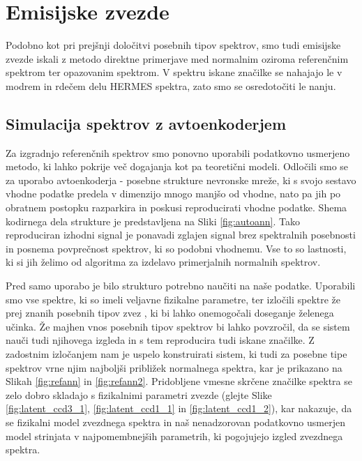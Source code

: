 \section{Emisijske zvezde}
\label{sec:slo_emisijske}
Podobno kot pri prejšnji določitvi posebnih tipov spektrov, smo tudi emisijske zvezde iskali z metodo direktne primerjave med normalnim oziroma referenčnim spektrom ter opazovanim spektrom. V spektru iskane značilke se nahajajo le v modrem in rdečem delu HERMES spektra, zato smo se osredotočiti le nanju.

\subsection{Simulacija spektrov z avtoenkoderjem}
Za izgradnjo referenčnih spektrov smo ponovno uporabili podatkovno usmerjeno metodo, ki lahko pokrije več dogajanja kot pa teoretični modeli. Odločili smo se za uporabo avtoenkoderja - posebne strukture nevronske mreže, ki s svojo sestavo vhodne podatke predela v dimenzijo mnogo manjšo od vhodne, nato pa jih po obratnem postopku razparkira in poskusi reproducirati vhodne podatke. Shema kodirnega dela strukture je predstavljena na Sliki \ref{fig:autoann}. Tako reproduciran izhodni signal je ponavadi zglajen signal brez spektralnih posebnosti in posnema povprečnost spektrov, ki so podobni vhodnemu. Vse to so lastnosti, ki si jih želimo od algoritma za izdelavo primerjalnih normalnih spektrov. 

Pred samo uporabo je bilo strukturo potrebno naučiti na naše podatke. Uporabili smo vse spektre, ki so imeli veljavne fizikalne parametre, ter izločili spektre že prej znanih posebnih tipov zvez \cite{2017ApJS..228...24T}, ki bi lahko onemogočali doseganje želenega učinka. Že majhen vnos posebnih tipov spektrov bi lahko povzročil, da se sistem nauči tudi njihovega izgleda in s tem reproducira tudi iskane značilke. Z zadostnim izločanjem nam je uspelo konstruirati sistem, ki tudi za posebne tipe spektrov vrne njim najboljši približek normalnega spektra, kar je prikazano na Slikah \ref{fig:refann} in \ref{fig:refann2}. Pridobljene vmesne skrčene značilke spektra se zelo dobro skladajo s fizikalnimi parametri zvezde (glejte Slike \ref{fig:latent_ccd3_1}, \ref{fig:latent_ccd1_1} in \ref{fig:latent_ccd1_2}), kar nakazuje, da se fizikalni model zvezdnega spektra in naš nenadzorovan podatkovno usmerjen model strinjata v najpomembnejših parametrih, ki pogojujejo izgled zvezdnega spektra.


